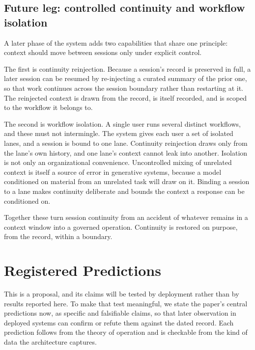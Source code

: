\documentclass[11pt]{article}
\begin{document}
\subsection{Future leg: controlled continuity and workflow isolation}
\label{sec:continuity}

A later phase of the system adds two capabilities that share one principle:
context should move between sessions only under explicit control.

The first is continuity reinjection. Because a session's record is preserved in
full, a later session can be resumed by re-injecting a curated summary of the
prior one, so that work continues across the session boundary rather than
restarting at it. The reinjected context is drawn from the record, is itself
recorded, and is scoped to the workflow it belongs to.

The second is workflow isolation. A single user runs several distinct workflows,
and these must not intermingle. The system gives each user a set of isolated
lanes, and a session is bound to one lane. Continuity reinjection draws only from
the lane's own history, and one lane's context cannot leak into another.
Isolation is not only an organizational convenience. Uncontrolled mixing of
unrelated context is itself a source of error in generative systems, because a
model conditioned on material from an unrelated task will draw on it. Binding a
session to a lane makes continuity deliberate and bounds the context a response
can be conditioned on.

Together these turn session continuity from an accident of whatever remains in a
context window into a governed operation. Continuity is restored on purpose, from
the record, within a boundary.

\section{Registered Predictions}
\label{sec:predictions}

This is a proposal, and its claims will be tested by deployment rather than by
results reported here. To make that test meaningful, we state the paper's central
predictions now, as specific and falsifiable claims, so that later observation in
deployed systems can confirm or refute them against the dated record. Each
prediction follows from the theory of operation and is checkable from the kind of
data the architecture captures.
\end{document}
